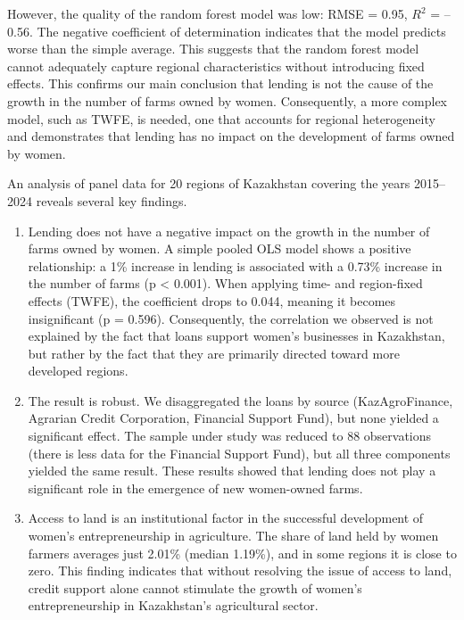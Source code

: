 ﻿\documentclass[pdflatex,sn-mathphys-ay]{sn-jnl}
\begin{document}
However, the quality of the random forest model was low: RMSE = 0.95, $R^2$
= --0.56. The negative coefficient of determination indicates that the
model predicts worse than the simple average. This suggests that the
random forest model cannot adequately capture regional characteristics
without introducing fixed effects. This confirms our main conclusion
that lending is not the cause of the growth in the number of farms owned
by women. Consequently, a more complex model, such as TWFE, is needed,
one that accounts for regional heterogeneity and demonstrates that
lending has no impact on the development of farms owned by women.

An analysis of panel data for 20 regions of Kazakhstan covering the
years 2015--2024 reveals several key findings.

\begin{enumerate}
\item Lending does not have a negative impact on the growth in the number
of farms owned by women. A simple pooled OLS model shows a positive
relationship: a 1\% increase in lending is associated with a 0.73\%
increase in the number of farms (p \textless{} 0.001). When applying
time- and region-fixed effects (TWFE), the coefficient drops to 0.044,
meaning it becomes insignificant (p = 0.596). Consequently, the
correlation we observed is not explained by the fact that loans support
women's businesses in Kazakhstan, but rather by the fact that they are
primarily directed toward more developed regions.

\item The result is robust. We disaggregated the loans by source
(KazAgroFinance, Agrarian Credit Corporation, Financial Support Fund),
but none yielded a significant effect. The sample under study was
reduced to 88 observations (there is less data for the Financial Support
Fund), but all three components yielded the same result. These results
showed that lending does not play a significant role in the emergence of
new women-owned farms.

\item Access to land is an institutional factor in the successful
development of women's entrepreneurship in agriculture. The share of
land held by women farmers averages just 2.01\% (median 1.19\%), and in
some regions it is close to zero. This finding indicates that without
resolving the issue of access to land, credit support alone cannot
stimulate the growth of women's entrepreneurship in Kazakhstan's
agricultural sector.


\end{enumerate}
\end{document}
